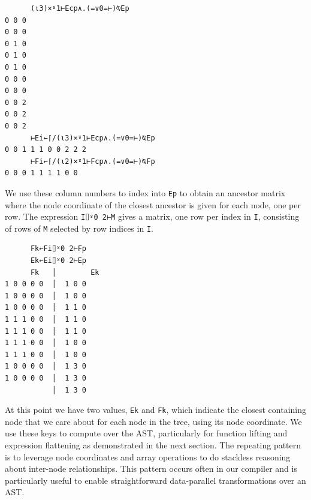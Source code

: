﻿\documentclass[numbers,10pt,preprint]{sigplanconf}
\begin{document}
\begin{verbatim}
      (⍳3)×⍤1⊢Ecp∧.(=∨0=⊢)⍉Ep
0 0 0
0 0 0
0 1 0
0 1 0
0 1 0
0 0 0
0 0 0
0 0 2
0 0 2
0 0 2
      ⊢Ei←⌈/(⍳3)×⍤1⊢Ecp∧.(=∨0=⊢)⍉Ep
0 0 1 1 1 0 0 2 2 2
      ⊢Fi←⌈/(⍳2)×⍤1⊢Fcp∧.(=∨0=⊢)⍉Fp
0 0 0 1 1 1 1 0 0
\end{verbatim}

\noindent We use these column numbers to index into \verb;Ep; to obtain an ancestor matrix where the node coordinate of the closest ancestor is given for each node, one per row. The expression \verb;I⌷⍤0 2⊢M; gives a matrix, one row per index in \verb;I;, consisting of rows of \verb;M; selected by row indices in \verb;I;.

\begin{verbatim}
      Fk←Fi⌷⍤0 2⊢Fp
      Ek←Ei⌷⍤0 2⊢Ep 
      Fk   │        Ek
1 0 0 0 0  │  1 0 0
1 0 0 0 0  │  1 0 0
1 0 0 0 0  │  1 1 0
1 1 1 0 0  │  1 1 0
1 1 1 0 0  │  1 1 0
1 1 1 0 0  │  1 0 0
1 1 1 0 0  │  1 0 0
1 0 0 0 0  │  1 3 0
1 0 0 0 0  │  1 3 0
           │  1 3 0
\end{verbatim}

\noindent At this point we have two values, \verb;Ek; and \verb;Fk;, which indicate the closest containing node that we care about for each node in the tree, using its node coordinate. We use these keys to compute over the AST, particularly for function lifting and expression flattening as demonstrated in the next section. The repeating pattern is to leverage node coordinates and array operations to do stackless reasoning about inter-node relationships. This pattern occurs often in our compiler and is particularly useful to enable straightforward data-parallel transformations over an AST.
\end{document}
